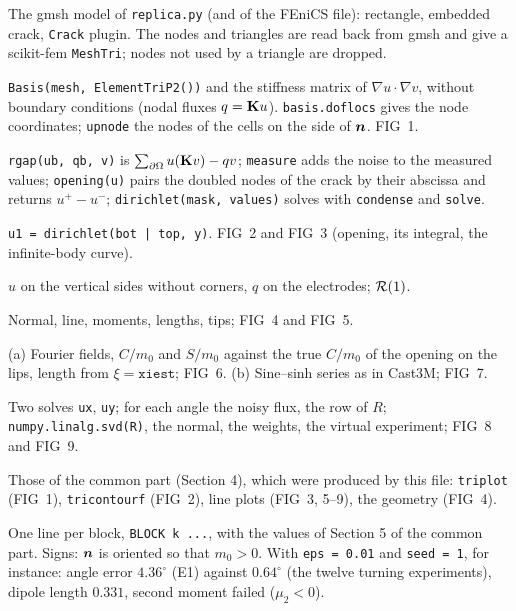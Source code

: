  The gmsh model of \texttt{replica.py}
(and of the FEniCS file): rectangle, embedded crack, \texttt{Crack} plugin.
The nodes and triangles are read back from gmsh and give a scikit-fem
\texttt{MeshTri}; nodes not used by a triangle are dropped.

 \texttt{Basis(mesh, ElementTriP2())} and the
stiffness matrix of $\nabla u\cdot\nabla v$, without boundary conditions (nodal
fluxes $q=\mathbf{K}u$). \texttt{basis.doflocs} gives the node coordinates;
\texttt{upnode} the nodes of the cells on the side of $\bm{n}$. FIG~1.

 \texttt{rgap(ub, qb, v)} is
$\sum_{\partial\Omega}u(\mathbf{K}v)-qv$; \texttt{measure} adds the noise to the
measured values; \texttt{opening(u)} pairs the doubled nodes of the crack by
their abscissa and returns $u^+-u^-$; \texttt{dirichlet(mask, values)} solves
with \texttt{condense} and \texttt{solve}.

 \texttt{u1 = dirichlet(bot | top, y)}. FIG~2
and FIG~3 (opening, its integral, the infinite-body curve).

 $u$ on the vertical sides without corners,
$q$ on the electrodes; $\mathcal{R}(1)$.

 Normal, line, moments, lengths, tips; FIG~4 and FIG~5.

 (a) Fourier fields, $C/m_0$ and $S/m_0$ against the true
$C/m_0$ of the opening on the lips, length from $\xi=\texttt{xiest}$; FIG~6.
(b) Sine--sinh series as in Cast3M; FIG~7.

 Two solves \texttt{ux}, \texttt{uy}; for each angle the noisy
flux, the row of $R$; \texttt{numpy.linalg.svd(R)}, the normal, the weights,
the virtual experiment; FIG~8 and FIG~9.

Those of the common part (Section 4), which were produced by this file:
\texttt{triplot} (FIG~1), \texttt{tricontourf} (FIG~2), line plots (FIG~3, 5--9),
the geometry (FIG~4).

One line per block, \texttt{BLOCK k ...}, with the values of Section 5 of the
common part. Signs: $\bm{n}$ is oriented so that $m_0>0$. With
\texttt{eps = 0.01} and \texttt{seed = 1}, for instance: angle error
$4.36^\circ$ (E1) against $0.64^\circ$ (the twelve turning experiments), dipole
length $0.331$, second moment failed ($\mu_2<0$).

